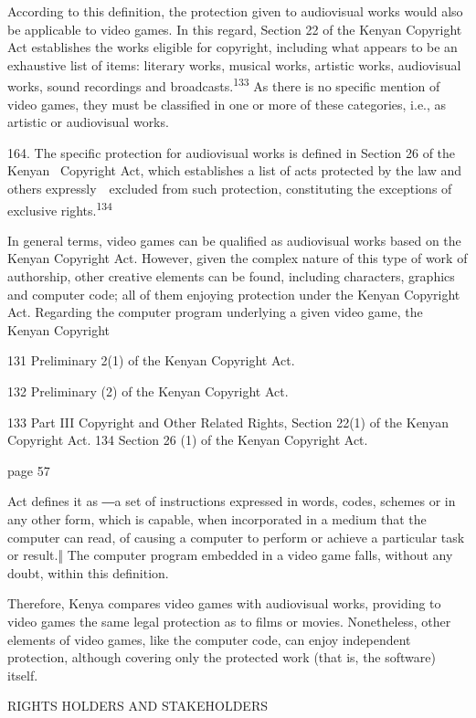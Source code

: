 \documentclass[
]{article}
\begin{document}
{According to this definition, the protection given to audiovisual works
would also be applicable to video games. In this regard, Section 22 of
the Kenyan }{Copyright Act }{establishes the works eligible for
copyright, including what appears to be an exhaustive list of items:
literary works, musical works, artistic works, audiovisual works, sound
recordings and broadcasts.}\textsuperscript{{133 }}{As there is no
specific mention of video games, they must be classified in one or more
of these categories, i.e., as artistic or audiovisual works.}

{164. }{The specific protection for audiovisual works is defined in
Section 26 of the Kenyan }{~Copyright Act}{, which establishes a list of
acts protected by the law and others expressly~~excluded from such
protection, constituting the exceptions of exclusive
rights.}\textsuperscript{{134}}

{In general terms, video games can be qualified as }{audiovisual works
}{based on the Kenyan }{Copyright Act}{. However, given the complex
nature of this type of work of authorship, other creative elements can
be found, including characters, graphics and computer code; all of them
enjoying protection under the Kenyan }{Copyright Act}{. Regarding the
computer program underlying a given video game, the Kenyan }{Copyright}

{131 }{Preliminary 2(1) of the Kenyan }{Copyright Act.}

{132 }{Preliminary (2) of the Kenyan }{Copyright Act}{.}

{133 }{Part III Copyright and Other Related Rights, Section 22(1) of the
Kenyan }{Copyright Act}{. }{134 }{Section 26 (1) of the Kenyan
}{Copyright Act.}

{page 57}

{Act }{defines it as ―}{a set of instructions expressed in words, codes,
schemes or in any other form, which is capable, when incorporated in a
medium that the computer can read, of causing a com}{puter to perform or
achieve a particular task or result.‖ }{The computer program embedded in
a video game falls, without any doubt, within this definition.}

{Therefore, Kenya compares video games with audiovisual works, providing
to video games the same legal protection as to films or movies.
Nonetheless, other elements of video games, like the computer code, can
enjoy independent protection, although covering only the protected work
(that is, the software) itself.}

{RIGHTS HOLDERS AND STAKEHOLDERS}
\end{document}
